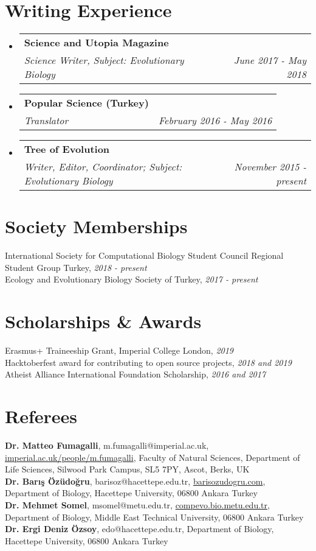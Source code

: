 \documentclass[letterpaper,11pt]{article}
\makeatletter
\newcommand{\resumeSubheading}[4]{
  \vspace{-1pt}\item
    \begin{tabular*}{0.97\textwidth}{l@{\extracolsep{\fill}}r}
      \textbf{#1} & #2 \\
      \textit{\small#3} & \textit{\small #4} \\
    \end{tabular*}\vspace{-5pt}
}
\newcommand{\resumeSubHeadingListStart}{\begin{itemize}[leftmargin=*]}
\newcommand{\resumeSubHeadingListEnd}{\end{itemize}}
\makeatother
\begin{document}
\section{Writing Experience}
  \resumeSubHeadingListStart
    \resumeSubheading
      {Science and Utopia Magazine}{ }
      {Science Writer, Subject: Evolutionary Biology}{June 2017 - May 2018}
    \resumeSubheading
      {Popular Science (Turkey)}{ }
      {Translator}{February 2016 - May 2016}
    \resumeSubheading
      {Tree of Evolution}{ }
      {Writer, Editor, Coordinator; Subject: Evolutionary Biology}{November 2015 - present}
  \resumeSubHeadingListEnd

\section{Society Memberships}	
International Society for Computational Biology Student Council Regional Student Group Turkey, \textit{2018 - present} \\
Ecology and Evolutionary Biology Society of Turkey, \textit{2017 - present} \\


\section{Scholarships \& Awards}
Erasmus+ Traineeship Grant, Imperial College London, \textit{2019} \\
Hacktoberfest award for contributing to open source projects, \textit{2018 and 2019} \\
Atheist Alliance International Foundation Scholarship, \textit{2016 and 2017} \\


\section{Referees}
\textbf{Dr. Matteo Fumagalli}, m.fumagalli@imperial.ac.uk, \href{https://www.imperial.ac.uk/people/m.fumagalli}{imperial.ac.uk/people/m.fumagalli}, Faculty of Natural Sciences, Department of Life Sciences, Silwood Park Campus, SL5 7PY, Ascot, Berks, UK \\
\textbf{Dr. Bar{\i}\c{s} \"{O}z\"{u}do\u{g}ru}, barisoz@hacettepe.edu.tr, \href{https://www.barisozudogru.com/}{barisozudogru.com}, Department of Biology, Hacettepe University, 06800 Ankara Turkey \\
\textbf{Dr. Mehmet Somel}, msomel@metu.edu.tr, \href{http://compevo.bio.metu.edu.tr}{compevo.bio.metu.edu.tr}, Department of Biology, Middle East Technical University, 06800 Ankara Turkey \\
\textbf{Dr. Ergi Deniz \"{O}zsoy}, edo@hacettepe.edu.tr, Department of Biology, Hacettepe University, 06800 Ankara Turkey  \\


\end{document}
